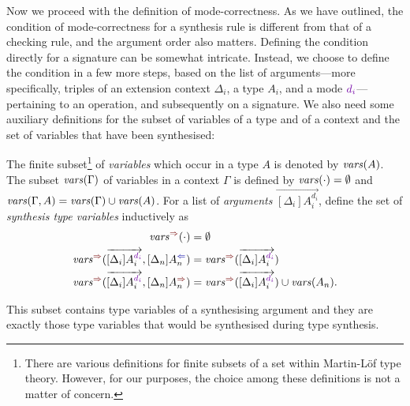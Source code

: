 Now we proceed with the definition of mode-correctness.
As we have outlined, the condition of mode-correctness for a synthesis rule is different from that of a checking rule, and the argument order also matters.
Defining the condition directly for a signature can be somewhat intricate.
Instead, we choose to define the condition in a few more steps, based on the list of arguments---more specifically, triples of an extension context $\Delta_i$, a type $A_i$, and a mode $\dir{d_i}$---pertaining to an operation, and subsequently on a signature.
We also need some auxiliary definitions for the subset of variables of a type and of a context and the set of variables that have been synthesised:
\begin{definition}
  The finite subset\footnote{%
  There are various definitions for finite subsets of a set within Martin-L\"{o}f type theory.
  However, for our purposes, the choice among these definitions is not a matter of concern.}
  of \emph{variables} which occur in a type $A$ is denoted by $\mathit{vars}(A)$.
  The subset $\mathit{vars}(\Gamma)$ of variables in a context $\Gamma$ is defined by $\mathit{vars}(\cdot) = \emptyset$ and $\mathit{vars}(\Gamma, A) = \mathit{vars}(\Gamma) \cup \mathit{vars}(A)$.
  For a list of \emph{arguments} $\overrightarrow{[\Delta_i]A_i^{d_i}}$, define the set of \emph{synthesis type variables} inductively as 
  \begin{align*}
    \synvar(\cdot)                                  & = \emptyset  \\
    \synvar(\overrightarrow{[\Delta_i]A_i^{\dir{d_i}}}, [\Delta_{n}] A_{n}^{\dir{\chk}}) & = 
    \synvar(\overrightarrow{[\Delta_i]A_i^{\dir{d_i}}}) \\
    \synvar(\overrightarrow{[\Delta_i]A_i^{\dir{d_i}}}, [\Delta_{n}] A_{n}^{\dir{\syn}}) & = 
    \synvar(\overrightarrow{[\Delta_i]A_i^{\dir{d_i}}}) \cup \fv(A_{n}).
  \end{align*}
\end{definition}
This subset contains type variables of a synthesising argument and they are exactly those type variables that would be synthesised during type synthesis.

